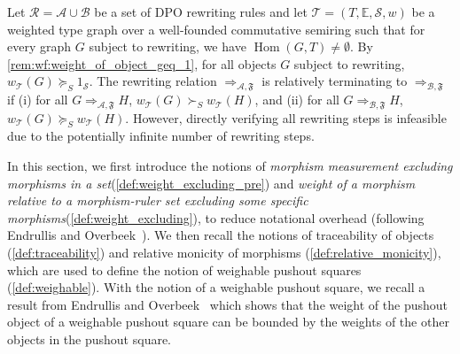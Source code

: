 Let \( \mathcal{R} = \mathcal{A} \cup \mathcal{B} \) be a set of DPO rewriting rules and let $\mathcal{T}=(T,\mathbb{E},\mathcal{S},w)$ be a weighted type graph over a well-founded commutative semiring such that for every graph $G$ subject to rewriting, we have $\operatorname{Hom}(G,T)\neq \emptyset$. By \autoref{rem:wf:weight_of_object_geq_1}, for all objects \( G \) subject to rewriting, \(w_\mathcal{T}(G) \succeq_S 1_\mathcal{S} \).
The rewriting relation \( \Rightarrow_{\mathcal{A},\mathfrak{F}} \) is relatively terminating to $\Rightarrow_{\mathcal{B},\mathfrak{F}}$ if (i) for all \(G \Rightarrow_{\mathcal{A},\mathfrak{F}} H\), \( w_\mathcal{T}(G) \succ_S w_\mathcal{T}(H)\), and (ii) for all \(G \Rightarrow_{\mathcal{B},\mathfrak{F}} H\), \( w_\mathcal{T}(G) \succeq_S w_\mathcal{T}(H) \). However, directly verifying all rewriting steps is infeasible due to the potentially infinite number of rewriting steps.

In this section, we first introduce the notions of \emph{morphism measurement excluding morphisms in a set}(\autoref{def:weight_excluding_pre}) and \emph{weight of a morphism relative to a morphism-ruler set excluding some specific morphisms}(\autoref{def:weight_excluding}),
to reduce notational overhead (following Endrullis and Overbeek~\cite{endrullis2024generalized_icgt}).
We then recall the notions of traceability of objects (\autoref{def:traceability}) and relative monicity of morphisms (\autoref{def:relative_monicity}),
which are used to define the notion of weighable pushout squares (\autoref{def:weighable}). With the notion of a weighable pushout square, we recall a result from Endrullis and Overbeek~\cite{endrullis2024generalized_icgt} which shows that the weight of the pushout object of a weighable pushout square can be bounded by the weights of the other objects in the pushout square.


